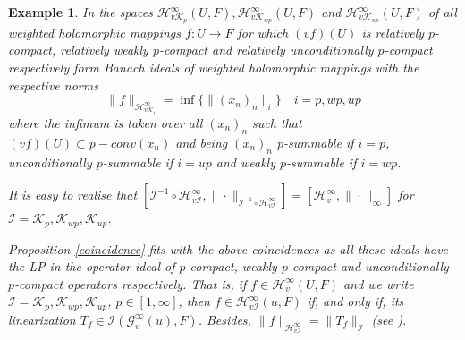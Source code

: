 \documentclass[12pt]{amsart}
\theoremstyle{plain}
\newtheorem{example}[theorem]{Example}
\numberwithin{equation}{section}
\begin{document}
\begin{example}   In \cite{CaJiKe} the spaces $\mathcal H_{v \mathcal K_p}^\infty(U,F),\mathcal H_{v \mathcal K_{wp}}^\infty(U,F)$ and $\mathcal H_{v \mathcal K_{up}}^\infty(U,F)$ of all weighted holomorphic mappings $f:U\to F$ for which $(vf)(U)$ is relatively $p$-compact, relatively weakly $p$-compact and relatively unconditionally $p$-compact respectively form Banach ideals of weighted holomorphic mappings with the respective norms 
$$
\|f\|_{\mathcal H_{v\mathcal K_i}^\infty}=\inf\{ \|(x_n)_n\|_i\} \quad i=p,wp,up
$$
where the infimum is taken over all $(x_n)_n$ such that $(vf)(U)\subset p-conv(x_n)$ and being $(x_n)_n$ $p$-summable if $i=p$, unconditionally $p$-summable if $i=up$ and weakly $p$-summable if $i=wp$.

 It is easy to realise that $[\mathcal I^{-1}\circ \mathcal H_{v\mathcal I}^\infty, \|\cdot\|_{\mathcal I^{-1}\circ \mathcal H_{v\mathcal I}^\infty}]=[\mathcal H_v^\infty,\|\cdot\|_\infty]$ for $\mathcal I=\mathcal K_p, \mathcal K_{wp}, \mathcal K_{up}$.

Proposition \ref{coincidence} fits with  the above coincidences as  all these ideals have the LP in the operator ideal of $p$-compact, weakly $p$-compact and unconditionally $p$-compact operators respectively. That is, if $f\in \mathcal H_v^\infty(U,F)$ and we write $\mathcal I=\mathcal K_p, \mathcal K_{wp}, \mathcal K_{up}$, $p\in [1,\infty]$, then $f\in \mathcal H_{v\mathcal I}^\infty (u,F)$ if, and only if, its linearization $T_f\in \mathcal I(\mathcal G_v^\infty(u),F)$. Besides, $\| f\|_{\mathcal H_{v\mathcal I}^\infty}=\|T_f\|_{\mathcal I}$ (see \cite[Theorem 2.9]{CaJiKe}).

 \end{example}
\end{document}
